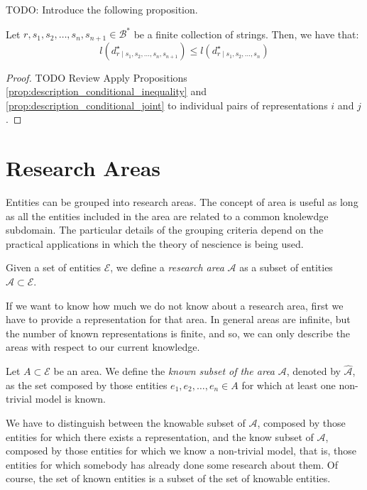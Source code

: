 {\color{red} TODO: Introduce the following proposition.}

\begin{proposition}
Let $r, s_1, s_2, \ldots, s_n, s_{n+1} \in \mathcal{B}^\ast$ be a finite collection of strings. Then, we have that:
\[
l \left( d^\star_{r \mid s_1, s_2, \ldots, s_n, s_{n+1}} \right) \leq l \left( d^\star_{r \mid s_1, s_2, \ldots, s_n} \right)
\]
\end{proposition}
\begin{proof}
{\color{red} TODO Review} Apply Propositions \ref{prop:description_conditional_inequality} and \ref{prop:description_conditional_joint} to individual pairs of representations $i$ and $j$.
\end{proof}

%
%

\section{Research Areas}
\label{sec:areas}

Entities can be grouped into research areas. The concept of area is useful as long as all the entities included in the area are related to a common knolewdge subdomain. The particular details of the grouping criteria depend on the practical applications in which the theory of nescience is being used.

\begin{definition}
Given a set of entities $\mathcal{E}$, we define a \emph{research area} $\mathcal{A}$ as a subset of entities $\mathcal{A} \subset \mathcal{E}$.
\end{definition}

If we want to know how much we do not know about a research area, first we have to provide a representation for that area. In general areas are infinite, but the number of known representations is finite, and so, we can only describe the areas with respect to our current knowledge.

\begin{definition}
Let $A \subset \mathcal{E}$ be an area. We define the \emph{known subset of the area} $\mathcal{A}$, denoted by $\hat{\mathcal{A}}$, as the set composed by those entities $e_1, e_2, \ldots, e_n \in A$ for which at least one non-trivial model is known.
\end{definition}

We have to distinguish between the knowable subset of $\mathcal{A}$, composed by those entities for which there exists a representation, and the know subset of $\mathcal{A}$, composed by those entities for which we know a non-trivial model, that is, those entities for which somebody has already done some research about them. Of course, the set of known entities is a subset of the set of knowable entities.

